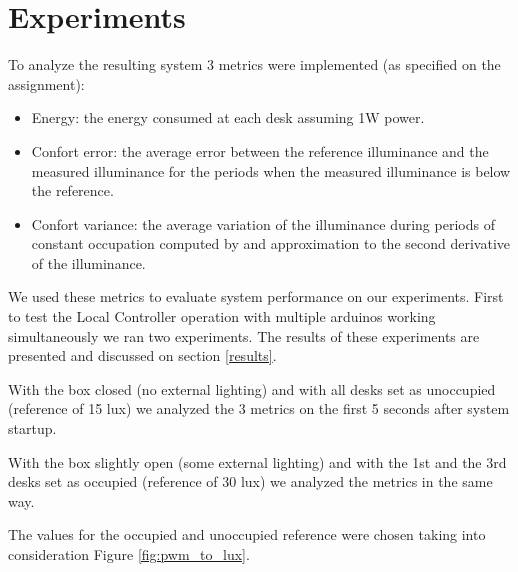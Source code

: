 \section{Experiments}

To analyze the resulting system 3 metrics were implemented (as specified on the assignment):
\begin{itemize}
    \item Energy: the energy consumed at each desk assuming 1W power.

    \item Confort error: the average error between the reference illuminance and the measured
illuminance for the periods when the measured illuminance is below the reference.

    \item Confort variance: the average variation of the illuminance during periods of constant occupation computed by and approximation to the second derivative of the illuminance.
\end{itemize}

We used these metrics to evaluate system performance on our experiments. First to test the Local Controller operation with multiple arduinos working simultaneously we ran two experiments. The results of these experiments are presented and discussed on section \ref{results}.

With the box closed (no external lighting) and with all desks set as unoccupied (reference of 15 lux) we analyzed the 3 metrics on the first 5 seconds after system startup.

With the box slightly open (some external lighting) and with the 1st and the 3rd desks set as occupied (reference of 30 lux) we analyzed the metrics in the same way.

The values for the occupied and unoccupied reference were chosen taking into consideration Figure \ref{fig:pwm_to_lux}.
